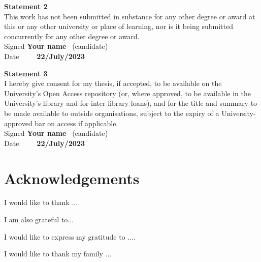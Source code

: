 \documentclass[12pt]{book}
\begin{document}
\noindent\textbf{\large Statement 2}\\[1ex]
This work has not been submitted in substance for any other degree or award at this
or any other university or place of learning, nor is it being submitted concurrently for
any other degree or award.\\[2ex]
Signed \textbf{Your name} \ (candidate) \hspace*{10em}\\[1ex]
Date\ \ \ \ \ \textbf{22/July/2023} \hspace*{18em}
\vfill

\noindent \textbf{\large Statement 3}\\[1ex]
I hereby give consent for my thesis, if accepted, to be available on the University’s
Open Access repository (or, where approved, to be available in the University's
library and for inter-library loans), and for the title and summary to be made available
to outside organisations, subject to the expiry of a University-approved bar on
access if applicable.\\[2ex]
Signed \textbf{Your name} \ (candidate) \hspace*{10em}\\[1ex]
Date\ \ \ \ \ \textbf{22/July/2023} \hspace*{18em}
\vfill


\chapter*{Acknowledgements}

I would like to thank ...

\hfill

\noindent I am also grateful to...
\hfill

\noindent I would like to express my gratitude to ....

\hfill

\noindent I would like to thank my family ...



\tableofcontents

\listoffigures
{}

\listoftables
{}

\listofalgorithms
{}
\end{document}
